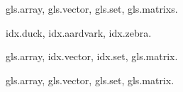 \documentclass{article}
\begin{document}
\gls{gls.array}, \gls{gls.vector}, \gls{gls.set}, \glspl{gls.matrix}.

\gls{idx.duck}, \gls{idx.aardvark}, \gls{idx.zebra}.

\newpage
\gls{gls.array}, \gls{idx.vector}, \gls{idx.set}, \gls{gls.matrix}.

\newpage
\gls{gls.array}, \gls{gls.vector}, \gls{gls.set}, \gls{gls.matrix}.


\renewcommand{\glstreenamefmt}[1]{\textsc{#1}}
\printunsrtglossary[type=main,style=index]

\renewcommand{\glstreenamefmt}[1]{#1}
\printunsrtglossary[type=index,style=mcolindexgroup]
\end{document}
